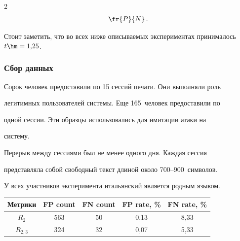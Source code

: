 \begin{multicols}{2}
\begin{align*}
\fr{P}{N}\,.

\end{align*}



Стоит заметить, что во всех ниже описываемых экспериментах принималось $t \hm= 1{,}25$.



\subsubsection{Сбор данных}



Сорок человек предоставили по 15 сессий печати. Они выполняли роль

легитимных пользователей системы. Еще 165~человек предоставили по

одной сессии. Эти образцы использовались для имитации атаки на

систему.



Перерыв между сессиями был не менее одного дня. Каждая сессия

представляла собой свободный текст длиной около 700--900~символов.



У всех участников эксперимента итальянский является родным языком.



\begin{table}[b]\small %

\begin{center}


        \label{res_sing}

\vspace*{2ex}




    \begin{tabular}{|c|c|c|c|c|}

                    \hline

                    Метрики& FP count& FN count & FP rate, \% & FN rate, \%\\

                    \hline

 $R_2$ & 563& 50& 0,13& 8,33\\

 $R_{2,3}$ &  324& 32& 0,07& 5,33\\


\end{tabular}
\end{center}
\end{table}
\end{multicols}
